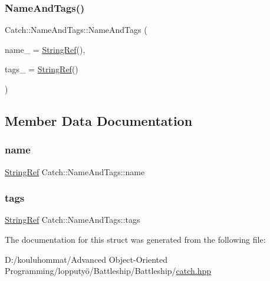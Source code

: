 \subsubsection{\texorpdfstring{Name\+And\+Tags()}{NameAndTags()}}
{\footnotesize\ttfamily Catch\+::\+Name\+And\+Tags\+::\+Name\+And\+Tags (\begin{DoxyParamCaption}\item[{\mbox{\hyperlink{class_catch_1_1_string_ref}{String\+Ref}} const \&}]{name\+\_\+ = {\ttfamily \mbox{\hyperlink{class_catch_1_1_string_ref}{String\+Ref}}()},  }\item[{\mbox{\hyperlink{class_catch_1_1_string_ref}{String\+Ref}} const \&}]{tags\+\_\+ = {\ttfamily \mbox{\hyperlink{class_catch_1_1_string_ref}{String\+Ref}}()} }\end{DoxyParamCaption})\hspace{0.3cm}{\ttfamily [noexcept]}}



\subsection{Member Data Documentation}
\mbox{\label{struct_catch_1_1_name_and_tags_a7cbea60e0cebfa622c667008eb011420}} 
\subsubsection{\texorpdfstring{name}{name}}
{\footnotesize\ttfamily \mbox{\hyperlink{class_catch_1_1_string_ref}{String\+Ref}} Catch\+::\+Name\+And\+Tags\+::name}

\mbox{\label{struct_catch_1_1_name_and_tags_a74062ed1138834a348424eb7ed900c57}} 
\subsubsection{\texorpdfstring{tags}{tags}}
{\footnotesize\ttfamily \mbox{\hyperlink{class_catch_1_1_string_ref}{String\+Ref}} Catch\+::\+Name\+And\+Tags\+::tags}



The documentation for this struct was generated from the following file\+:\begin{DoxyCompactItemize}
\item 
D\+:/kouluhommat/\+Advanced Object-\/\+Oriented Programming/lopputyö/\+Battleship/\+Battleship/\mbox{\hyperlink{catch_8hpp}{catch.\+hpp}}\end{DoxyCompactItemize}
